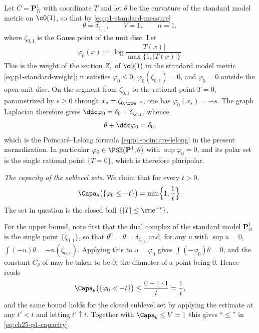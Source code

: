 \begin{example}
\label{ex:ch25-pluripolar-computed}
Let \(C=\mathbf P^1_K\) with coordinate \(T\) and let \(\theta\) be the
curvature of the standard model metric on \(\cO(1)\), so that by
\eqref{eq:p1-standard-measure}
\[
 \theta=\delta_{\zeta_{0,1}},\qquad V=1,\qquad n=1,
\]
where \(\zeta_{0,1}\) is the Gauss point of the unit disc.  Let
\[
 \varphi_0(x):=\log\frac{|T(x)|}{\max\{1,|T(x)|\}} .
\]
This is the weight of the section \(Z_1\) of \(\cO(1)\) in the standard model
metric \eqref{eq:p1-standard-weight}; it satisfies \(\varphi_0\leq0\),
\(\varphi_0(\zeta_{0,1})=0\), and \(\varphi_0=0\) outside the open unit disc.
On the segment from \(\zeta_{0,1}\) to the rational point \(T=0\),
parametrized by \(s\geq0\) through \(x_s=\zeta_{0,\rme^{-s}}\), one has
\(\varphi_0(x_s)=-s\).  The graph Laplacian therefore gives
\(\ddc\varphi_0=\delta_0-\delta_{\zeta_{0,1}}\), whence
\[
 \theta+\ddc\varphi_0=\delta_0,
\]
which is the Poincar\'e--Lelong formula \eqref{eq:p1-poincare-lelong} in the
present normalization.  In particular \(\varphi_0\in\PSH(\mathbf P^1,\theta)\)
with \(\sup\varphi_0=0\), and its polar set is the single rational point
\(\{T=0\}\), which is therefore pluripolar.

\emph{The capacity of the sublevel sets.}  We claim that for every
\(t>0\),
\begin{equation}
\label{eq:ch25-p1-capacity}
 \Capa_\theta\bigl(\{\varphi_0\leq-t\}\bigr)=\min\Bigl\{1,\frac1t\Bigr\} .
\end{equation}
The set in question is the closed ball \(\{|T|\leq\rme^{-t}\}\).

For the upper bound, note first that the dual complex of the standard model
\(\mathbf P^1_R\) is the single point \(\{\zeta_{0,1}\}\), so that
\(\theta^n=\theta=\delta_{\zeta_{0,1}}\) and, for any \(u\) with
\(\sup u=0\), \(\int(-u)\theta=-u(\zeta_{0,1})\).  Applying this to
\(u=\varphi_0\) gives \(\int(-\varphi_0)\theta=0\), and the constant
\(C_\theta\) of  may be taken to be \(0\),
the diameter of a point being \(0\).  Hence
 reads
\[
 \Capa_\theta\bigl(\{\varphi_0<-t\}\bigr)\leq\frac{0+1\cdot1}{t}
 =\frac1t ,
\]
and the same bound holds for the closed sublevel set by applying the estimate
at any \(t'<t\) and letting \(t'\uparrow t\).  Together with
\(\Capa_\theta\leq V=1\) this gives ``\(\leq\)'' in
\eqref{eq:ch25-p1-capacity}.


\end{example}
